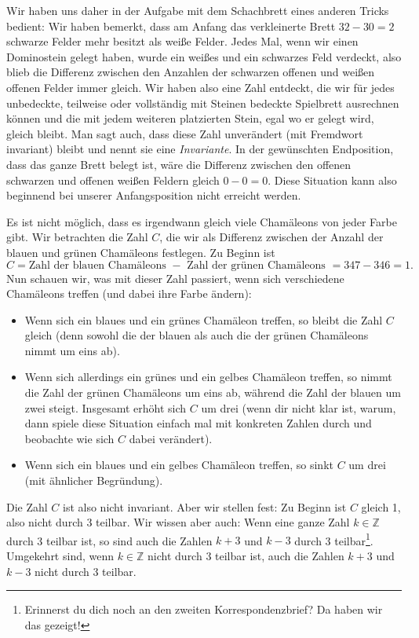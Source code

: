 \documentclass[a4paper,ngerman,12pt]{scrartcl}
\newcommand{\ZZ}{\mathbb{Z}}
\theoremstyle{definition}
\theoremstyle{plain}
\theoremstyle{remark}
\begin{document}
Wir haben uns daher in der Aufgabe mit dem Schachbrett eines anderen Tricks bedient: Wir haben bemerkt, dass am Anfang das verkleinerte Brett $32 - 30 = 2$ schwarze Felder mehr besitzt als weiße Felder. Jedes Mal, wenn wir einen Dominostein gelegt haben, wurde ein weißes und ein schwarzes Feld verdeckt, also blieb die Differenz zwischen den Anzahlen der schwarzen offenen und weißen offenen Felder immer gleich. Wir haben also eine Zahl entdeckt, die wir für jedes unbedeckte, teilweise oder vollständig mit Steinen bedeckte Spielbrett ausrechnen können und die mit jedem weiteren platzierten Stein, egal wo er gelegt wird, gleich bleibt. Man sagt auch, dass diese Zahl unverändert (mit Fremdwort invariant) bleibt und nennt sie eine \emph{Invariante}. In der gewünschten Endposition, dass das ganze Brett belegt ist, wäre die Differenz zwischen den offenen schwarzen und offenen weißen Feldern gleich $0 - 0 = 0$. Diese Situation kann also beginnend bei unserer Anfangsposition nicht erreicht werden.

Es ist nicht möglich, dass es irgendwann gleich viele Chamäleons von jeder Farbe gibt. Wir betrachten die Zahl $C$, die wir als Differenz zwischen der Anzahl der blauen und grünen Chamäleons festlegen. Zu Beginn ist
	\[C = \text{Zahl der blauen Chamäleons } - \text{ Zahl der grünen Chamäleons } = 347 - 346 = 1.\]
Nun schauen wir, was mit dieser Zahl passiert, wenn sich verschiedene Chamäleons treffen (und dabei ihre Farbe ändern):
\begin{itemize}
	\item Wenn sich ein blaues und ein grünes Chamäleon treffen, so bleibt die Zahl $C$ gleich (denn sowohl die der blauen als auch die der grünen Chamäleons nimmt um eins ab).
	\item Wenn sich allerdings ein grünes und ein gelbes Chamäleon treffen, so nimmt die Zahl der grünen Chamäleons um eins ab, während die Zahl der blauen um zwei steigt. Insgesamt erhöht sich $C$ um drei (wenn dir nicht klar ist, warum, dann spiele diese Situation einfach mal mit konkreten Zahlen durch und beobachte wie sich $C$ dabei verändert).
	\item Wenn sich ein blaues und ein gelbes Chamäleon treffen, so sinkt $C$ um drei (mit ähnlicher Begründung).
\end{itemize}

Die Zahl $C$ ist also nicht invariant. Aber wir stellen fest: Zu Beginn ist $C$ gleich 1, also nicht durch 3 teilbar. Wir wissen aber auch: Wenn eine ganze Zahl $k \in \ZZ$ durch 3 teilbar ist, so sind auch die Zahlen $k + 3$ und $k - 3$ durch 3 teilbar\footnote{Erinnerst du dich noch an den zweiten Korrespondenzbrief? Da haben wir das gezeigt!}. Umgekehrt sind, wenn $k \in \ZZ$ nicht durch 3 teilbar ist, auch die Zahlen $k + 3$ und $k - 3$ nicht durch 3 teilbar. 
\end{document}
